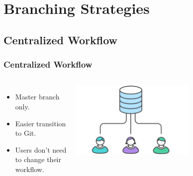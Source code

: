 
\section[Branching Strategies]{Branching Strategies}


\subsection[]{Centralized Workflow}
\begin{frame}
\frametitle{Centralized Workflow}
\begin{columns}
		\begin{itemize}
		\item Master branch only.
		\item Easier transition to Git.
		\item Users don’t need to change their workflow.
		\end{itemize}
		\includegraphics[width=\textwidth, height=0.62\textwidth]{centralized-workflow.png}
\end{columns}
\end{frame}

